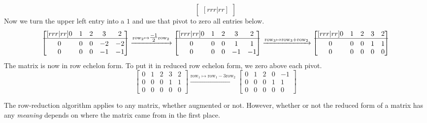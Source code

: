 \begin{example}
\[\begin{bmatrix}[rrr|rr]
	\end{bmatrix}
	\]
	Now we turn the upper left entry into a $1$ and use that pivot
	to zero all entries below.
	\[
	\begin{bmatrix}[rrr|rr]
		0&1&2&3&2\\
		\hline\\[\dimexpr-\normalbaselineskip+2pt]
		0&0&0&-2&-2\\0&0&0&-1&-1
	\end{bmatrix}
	\xrightarrow{\text{row}_2\mapsto\tfrac{-1}{2}\text{row}_2}
	\begin{bmatrix}[rrr|rr]
		0&1&2&3&2\\
		\hline\\[\dimexpr-\normalbaselineskip+2pt]
		0&0&0&1&1\\0&0&0&-1&-1
	\end{bmatrix}
	\xrightarrow{\text{row}_3\mapsto\text{row}_3+\text{row}_2}
	\begin{bmatrix}[rrr|rr]
		0&1&2&3&2\\
		\hline\\[\dimexpr-\normalbaselineskip+2pt]
		0&0&0&1&1\\0&0&0&0&0
	\end{bmatrix}
	\]
	The matrix is now in row echelon form. To put it in reduced row echelon
	form, we zero above each pivot.
	\[
	\begin{bmatrix}
		0&1&2&3&2\\
		0&0&0&1&1\\0&0&0&0&0
	\end{bmatrix}
	\xrightarrow{\text{row}_1\mapsto\text{row}_1-3\text{row}_2}
	\begin{bmatrix}
		0&1&2&0&-1\\
		0&0&0&1&1\\0&0&0&0&0
	\end{bmatrix}
	\]
\end{example}

The row-reduction algorithm applies to any matrix, whether augmented or not. However,
whether or not the reduced form of a matrix has any \emph{meaning} depends on where
the matrix came from in the first place.

	
